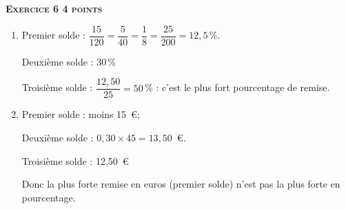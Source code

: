 \textbf{\textsc{Exercice 6 \hfill 4 points}}

\medskip


\begin{enumerate}
\item %
Premier solde : $\dfrac{15}{120} = \dfrac{5}{40} = \dfrac{1}{8} = \dfrac{25}{200} = 12,5\,\%$.

Deuxième solde : 30\,\%

Troisième solde : $\dfrac{12,50}{25} = 50$\,\% : c'est le plus fort pourcentage de remise.
\item %

Premier solde : moins 15~\euro ;

Deuxième solde : $0,30 \times 45 = 13,50$~\euro.

Troisième solde : 12,50~\euro

Donc la plus forte remise en euros (premier solde) n'est pas la plus forte en pourcentage.
\end{enumerate}

\vspace{0,5cm}


